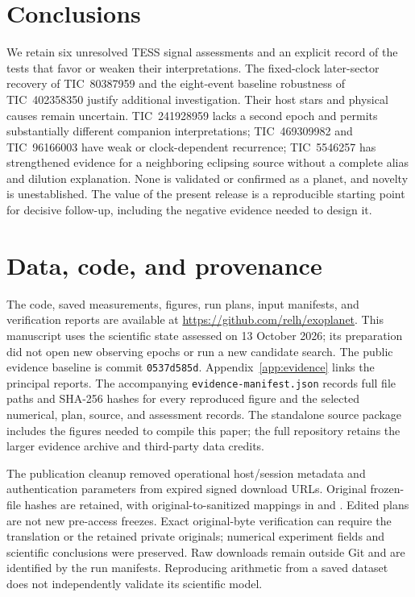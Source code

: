 \documentclass[11pt]{article}
\begin{document}
\section{Conclusions}
We retain six unresolved TESS signal assessments and an explicit record of the tests that favor or weaken their interpretations. The fixed-clock later-sector recovery of TIC~80387959 and the eight-event baseline robustness of TIC~402358350 justify additional investigation. Their host stars and physical causes remain uncertain. TIC~241928959 lacks a second epoch and permits substantially different companion interpretations; TIC~469309982 and TIC~96166003 have weak or clock-dependent recurrence; TIC~5546257 has strengthened evidence for a neighboring eclipsing source without a complete alias and dilution explanation. None is validated or confirmed as a planet, and novelty is unestablished. The value of the present release is a reproducible starting point for decisive follow-up, including the negative evidence needed to design it.

\section*{Data, code, and provenance}
The code, saved measurements, figures, run plans, input manifests, and verification reports are available at \url{https://github.com/relh/exoplanet}. This manuscript uses the scientific state assessed on 13 October 2026; its preparation did not open new observing epochs or run a new candidate search. The public evidence baseline is commit \texttt{0537d585d}. Appendix~\ref{app:evidence} links the principal reports. The accompanying \texttt{evidence-manifest.json} records full file paths and SHA-256 hashes for every reproduced figure and the selected numerical, plan, source, and assessment records. The standalone source package includes the figures needed to compile this paper; the full repository retains the larger evidence archive and third-party data credits.

The publication cleanup removed operational host/session metadata and authentication parameters from expired signed download URLs. Original frozen-file hashes are retained, with original-to-sanitized mappings in  and . Edited plans are not new pre-access freezes. Exact original-byte verification can require the translation or the retained private originals; numerical experiment fields and scientific conclusions were preserved. Raw downloads remain outside Git and are identified by the run manifests. Reproducing arithmetic from a saved dataset does not independently validate its scientific model.
\end{document}
